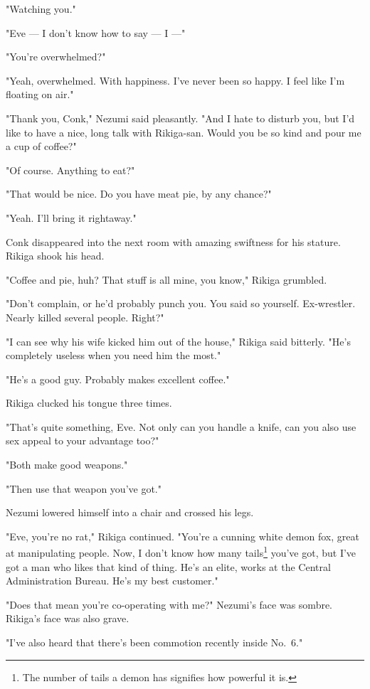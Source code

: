 "Watching you."

"Eve --- I don't know how to say --- I ---"

"You're overwhelmed?"

"Yeah, overwhelmed. With happiness. I've never been so happy. I feel
like I'm floating on air."

"Thank you, Conk," Nezumi said pleasantly. "And I hate to disturb you,
but I'd like to have a nice, long talk with Rikiga-san. Would you be so
kind and pour me a cup of coffee?"

"Of course. Anything to eat?"

"That would be nice. Do you have meat pie, by any chance?"

"Yeah. I'll bring it rightaway."

Conk disappeared into the next room with amazing swiftness for his
stature. Rikiga shook his head.

"Coffee and pie, huh? That stuff is all mine, you know," Rikiga
grumbled.

"Don't complain, or he'd probably punch you. You said so yourself.
Ex-wrestler. Nearly killed several people. Right?"

"I can see why his wife kicked him out of the house," Rikiga said
bitterly. "He's completely useless when you need him the most."

"He's a good guy. Probably makes excellent coffee."

Rikiga clucked his tongue three times.

"That's quite something, Eve. Not only can you handle a knife, can you
also use sex appeal to your advantage too?"

"Both make good weapons."

"Then use that weapon you've got."

Nezumi lowered himself into a chair and crossed his legs.

"Eve, you're no rat," Rikiga continued. "You're a cunning white demon
fox, great at manipulating people. Now, I don't know how many tails\footnote{The number of tails a demon has signifies how powerful it is.}
you've got, but I've got a man who likes that kind of thing. He's an
elite, works at the Central Administration Bureau. He's my best
customer."

"Does that mean you're co-operating with me?" Nezumi's face was sombre.
Rikiga's face was also grave.

"I've also heard that there's been commotion recently inside No.~6."

